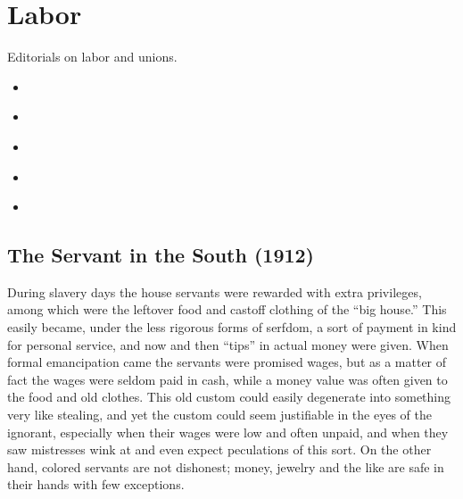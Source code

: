 \documentclass[letterpaper,10pt,english]{jupyterBook}
\begin{document}
\section{Labor}
\label{\detokenize{Sections/labor:labor}}\label{\detokenize{Sections/labor::doc}}
\sphinxAtStartPar
Editorials on labor and unions.
\begin{itemize}
\item {} 
\sphinxAtStartPar
{\hyperref[\detokenize{Volumes/03/06/servant_in_the_south::doc}]{}}

\item {} 
\sphinxAtStartPar
{\hyperref[\detokenize{Volumes/15/05/the_black_man_and_the_unions::doc}]{}}

\item {} 
\sphinxAtStartPar
{\hyperref[\detokenize{Volumes/18/05/labor_omnia_vincit::doc}]{}}

\item {} 
\sphinxAtStartPar
{\hyperref[\detokenize{Volumes/31/02/black_man_and_labor::doc}]{}}

\item {} 
\sphinxAtStartPar
{\hyperref[\detokenize{Volumes/31/06/again_pullman_porters::doc}]{}}

\end{itemize}


\subsection{The Servant in the South (1912)}
\label{\detokenize{Volumes/03/06/servant_in_the_south:the-servant-in-the-south-1912}}\label{\detokenize{Volumes/03/06/servant_in_the_south::doc}}
\sphinxAtStartPar
During slavery days the house servants were rewarded with extra privileges, among which were the left\sphinxhyphen{}over food and cast\sphinxhyphen{}off clothing of the “big house.” This easily became, under the less rigorous forms of serfdom, a sort of payment in kind for personal service, and now and then “tips” in actual money were given. When formal emancipation came the servants were promised wages, but as a matter of fact the wages were seldom paid in cash, while a money value was often given to the food and old clothes. This old custom could easily degenerate into something very like stealing, and yet the custom could seem justifiable in the eyes of the ignorant, especially when their wages were low and often unpaid, and when they saw mistresses wink at and even expect peculations of this sort. On the other hand, colored servants are not dishonest; money, jewelry and the like are safe in their hands with few exceptions.
\end{document}
